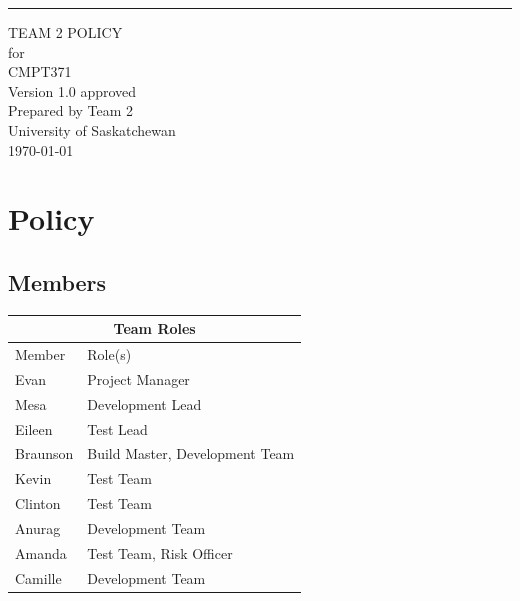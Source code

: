 \documentclass{scrreprt}
\date{}
\def\myversion{1.0 }
\begin{document}
\graphicspath{ {images/} }

\begin{flushright}
    \rule{16cm}{5pt}\vskip1cm
    \begin{bfseries}
        \Huge{TEAM 2 POLICY}\\
        \vspace{1.9cm}
        for\\
        \vspace{1.9cm}
        CMPT371\\
        \vspace{1.9cm}
        \LARGE{Version \myversion approved}\\
        \vspace{1.9cm}
        Prepared by Team 2\\
        \vspace{1.9cm}
        University of Saskatchewan\\
        \vspace{1.9cm}
        \today\\
    \end{bfseries}
\end{flushright}

\tableofcontents

\chapter{Policy}

\section{Members}

\begin{table}[h!]
\centering
\begin{tabular}{ |p{2cm}||p{8cm}|  }
    \hline
    \multicolumn{2}{|c|}{Team Roles} \\
    \hline
    Member & Role(s)\\
    \hline
    Evan & Project Manager\\
    Mesa & Development Lead\\
    Eileen & Test Lead\\
    Braunson & Build Master, Development Team\\
    Kevin & Test Team\\
    Clinton & Test Team\\
    Anurag & Development Team\\
    Amanda & Test Team, Risk Officer\\
    Camille & Development Team\\
    \hline
\end{tabular}
\end{table}
\end{document}

